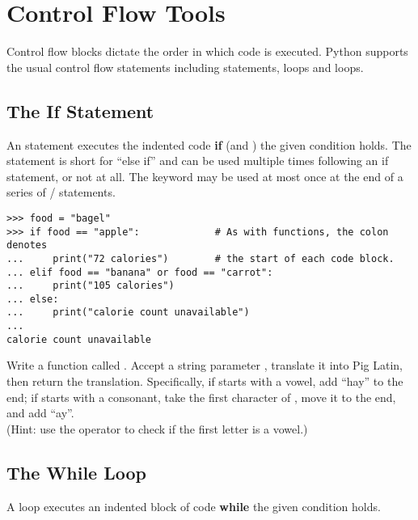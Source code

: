 \section*{Control Flow Tools} %

Control flow blocks dictate the order in which code is executed.
Python supports the usual control flow statements including  statements,  loops and  loops.

\subsection*{The If Statement} %

An  statement executes the indented code \textbf{if} (and ) the given condition holds.
The  statement is short for ``else if'' and can be used multiple times following an if statement, or not at all.
The  keyword may be used at most once at the end of a series of / statements.

\begin{lstlisting}
>>> food = "bagel"
>>> if food == "apple":             # As with functions, the colon denotes
...     print("72 calories")        # the start of each code block.
... elif food == "banana" or food == "carrot":
...     print("105 calories")
... else:
...     print("calorie count unavailable")
...
calorie count unavailable
\end{lstlisting}

\begin{problem} %
Write a function called .
Accept a string parameter , translate it into Pig Latin, then return the translation.
Specifically, if  starts with a vowel, add ``hay'' to the end; if  starts with a consonant, take the first character of , move it to the end, and add ``ay''.
\\
(Hint: use the  operator to check if the first letter is a vowel.)
\end{problem}

\subsection*{The While Loop} %

A  loop executes an indented block of code \textbf{while} the given condition holds.

